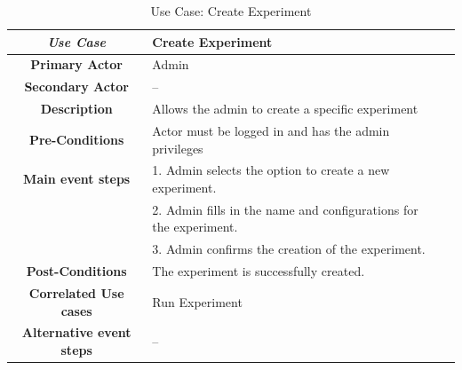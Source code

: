 \begin{table}[ht!]
    \centering
    \caption{Use Case: Create Experiment}
    \begin{tabularx}{\textwidth}{|Sl|S{X}|}
        \hline
        \textbf{\textit{Use Case}}       & \textbf{Create Experiment}                                                    \\ \hline
        \textbf{Primary Actor}           & Admin                                                                         \\ \hline
        \textbf{Secondary Actor}         & --                                                                            \\ \hline
        \textbf{Description}             & Allows the admin to create a specific experiment                              \\ \hline
        \textbf{Pre-Conditions}          & Actor must be logged in and has the admin privileges                          \\ \hline
        \textbf{Main event steps}        & 1. Admin selects the option to create a new experiment.                       \\
                                         & 2. Admin fills in the name and configurations for the experiment. \\
                                         & 3. Admin confirms the creation of the experiment.                             \\ \hline
        \textbf{Post-Conditions}         & The experiment is successfully created.                                       \\ \hline
        \textbf{Correlated Use cases}    & Run Experiment                                                                \\ \hline
        \textbf{Alternative event steps} & --                                                                            \\ \hline
    \end{tabularx}
\end{table}



